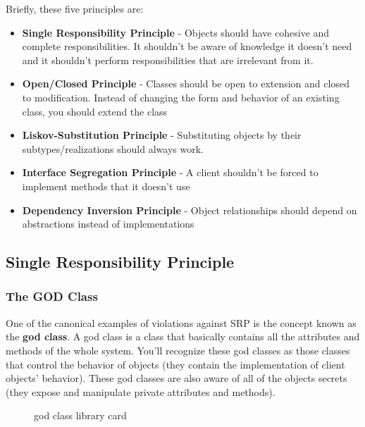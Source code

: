 Briefly, these five principles are:

\begin{itemize}
\tightlist
\item
  \textbf{Single Responsibility Principle} - Objects should have
  cohesive and complete responsibilities. It shouldn't be aware of
  knowledge it doesn't need and it shouldn't perform responsibilities
  that are irrelevant from it.
\item
  \textbf{Open/Closed Principle} - Classes should be open to extension
  and closed to modification. Instead of changing the form and behavior
  of an existing class, you should extend the class
\item
  \textbf{Liskov-Substitution Principle} - Substituting objects by their
  subtypes/realizations should always work.
\item
  \textbf{Interface Segregation Principle} - A client shouldn't be
  forced to implement methods that it doesn't use
\item
  \textbf{Dependency Inversion Principle} - Object relationships should
  depend on abstractions instead of implementations
\end{itemize}

\subsection{Single Responsibility
Principle}\label{solid-objects.md__single-responsibility-principle}

\subsubsection{The GOD Class}\label{solid-objects.md__the-god-class}

One of the canonical examples of violations against SRP is the concept
known as the \textbf{god class}. A god class is a class that basically
contains all the attributes and methods of the whole system. You'll
recognize these god classes as those classes that control the behavior
of objects (they contain the implementation of client objects'
behavior). These god classes are also aware of all of the objects
secrets (they expose and manipulate private attributes and methods).

\begin{figure}
\centering
{}
\caption{god class library card}
\end{figure}

